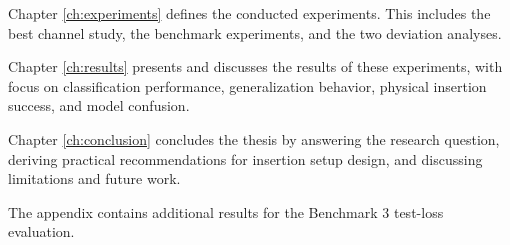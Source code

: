 Chapter \ref{ch:experiments} defines the conducted experiments. This includes the best channel study, the benchmark experiments, and the two deviation analyses.

Chapter \ref{ch:results} presents and discusses the results of these experiments, with focus on classification performance, generalization behavior, physical insertion success, and model confusion.

Chapter \ref{ch:conclusion} concludes the thesis by answering the research question, deriving practical recommendations for insertion setup design, and discussing limitations and future work.

The appendix contains additional results for the Benchmark 3 test-loss evaluation.

